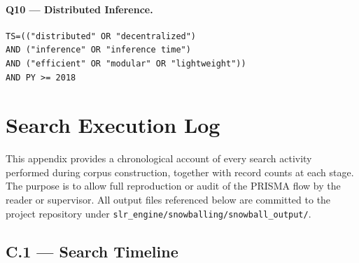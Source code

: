 \paragraph{Q10 — Distributed Inference.}
\begin{verbatim}
TS=(("distributed" OR "decentralized")
AND ("inference" OR "inference time")
AND ("efficient" OR "modular" OR "lightweight"))
AND PY >= 2018
\end{verbatim}


\section{Search Execution Log}
\label{app:search_log}

This appendix provides a chronological account of every search activity performed
during corpus construction, together with record counts at each stage. The purpose
is to allow full reproduction or audit of the PRISMA flow by the reader or supervisor.
All output files referenced below are committed to the project repository under
\texttt{slr\_engine/snowballing/snowball\_output/}.

\subsection*{C.1 — Search Timeline}
\label{app:search_log:timeline}


